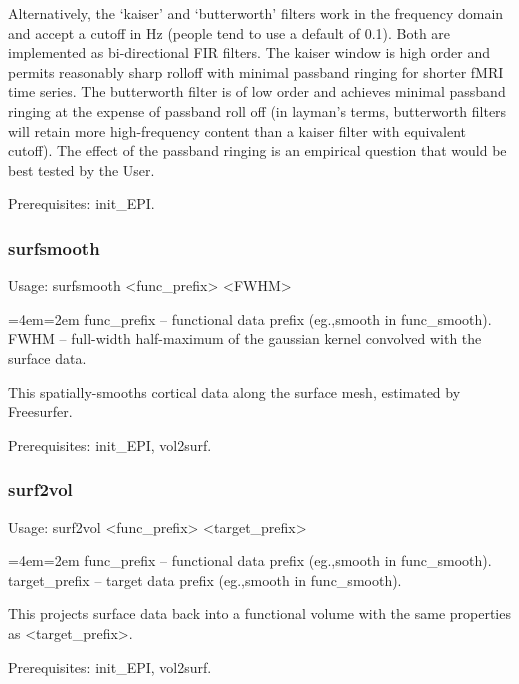 \documentclass[final,titlepage,letterpaper,oneside,12pt]{article}
\renewcommand{\texttt}[2][BrickRed]{\textcolor{#1}{\ttfamily #2}}%
\newenvironment{blockquote}{%
  \par%
  \medskip
  \leftskip=4em\rightskip=2em%
  \noindent\ignorespaces}{%
  \par\medskip}
\begin{document}
Alternatively, the `kaiser' and `butterworth' filters work in the frequency domain and accept a cutoff in Hz (people tend to use a default of 0.1). Both are implemented as bi-directional FIR filters. The kaiser window is high order and permits reasonably sharp rolloff with minimal passband ringing for shorter fMRI time series. The butterworth filter is of low order and achieves minimal passband ringing at the expense of passband roll off (in layman's terms, butterworth filters will retain more high-frequency content than a kaiser filter with equivalent cutoff). The effect of the passband ringing is an empirical question that would be best tested by the User.

Prerequisites: \texttt{init\_EPI}.

\subsubsection{surfsmooth}
Usage: \texttt{surfsmooth <func\_prefix> <FWHM>}

\begin{blockquote}
func\_prefix -- functional data prefix (eg.,smooth in func\_smooth). \\
FWHM -- full-width half-maximum of the gaussian kernel convolved with the surface data. \
\end{blockquote}

\noindent This spatially-smooths cortical data along the surface mesh, estimated by Freesurfer.

Prerequisites: \texttt{init\_EPI}, \texttt{vol2surf}.

\subsubsection{surf2vol}
Usage: \texttt{surf2vol <func\_prefix> <target\_prefix>}

\begin{blockquote}
func\_prefix -- functional data prefix (eg.,smooth in func\_smooth). \\
target\_prefix -- target data prefix (eg.,smooth in func\_smooth). \
\end{blockquote}

\noindent This projects surface data back into a functional volume with the same properties as <target\_prefix>.

Prerequisites: \texttt{init\_EPI}, \texttt{vol2surf}.
\end{document}
